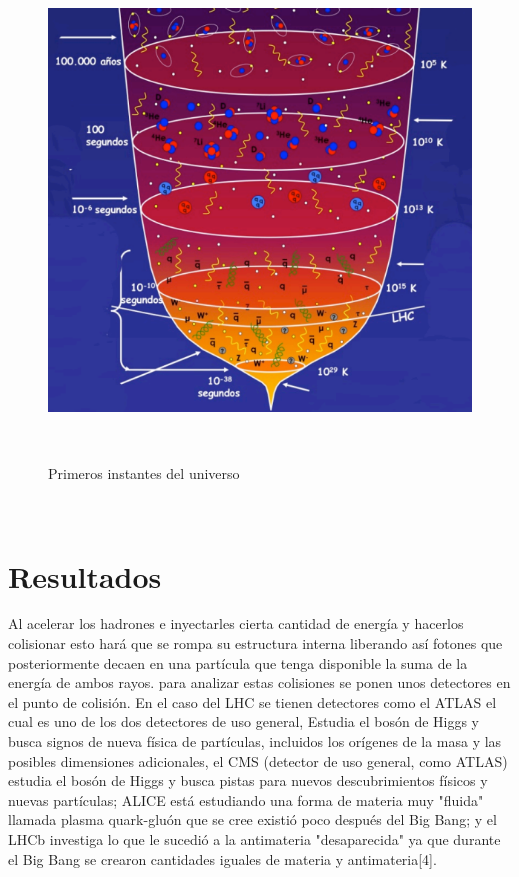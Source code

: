 \documentclass[%
 reprint,
 amsmath,amssymb,
 aps,
]{revtex4-2}
\begin{document}
\begin{figure}[H]
\begin{center}
\includegraphics[scale=0.4]{bb.png}
\caption{Primeros instantes del universo}\\
\centering
\end{center}
\end{figure}
\\
 
\section{\label{sec:level1}Resultados}

Al acelerar los hadrones e inyectarles cierta cantidad de energía y hacerlos colisionar esto hará que se rompa su estructura interna liberando así fotones que posteriormente decaen en una partícula que tenga disponible la suma de la energía de ambos rayos. para analizar estas colisiones se ponen unos detectores en el punto de colisión. En el caso del LHC se tienen detectores como el ATLAS el cual es uno de los dos detectores de uso general, Estudia el bosón de Higgs y busca signos de nueva física de partículas, incluidos los orígenes de la masa y las posibles dimensiones adicionales, el CMS (detector de uso general, como ATLAS) estudia el bosón de Higgs y busca pistas para nuevos descubrimientos físicos y nuevas partículas; ALICE está estudiando una forma de materia muy "fluida" llamada plasma quark-gluón que se cree existió poco después del Big Bang; y el LHCb investiga lo que le sucedió a la antimateria "desaparecida" ya que durante el Big Bang se crearon cantidades iguales de materia y antimateria[4].
\end{document}
